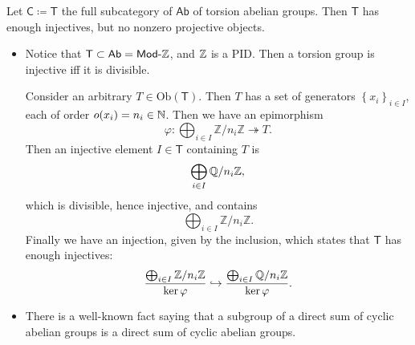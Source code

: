 \begin{ex}
	Let $\mathsf{C} \coloneqq \mathsf{T}$ the full subcategory of $\mathsf{Ab}$ of torsion abelian groups.
	Then $\mathsf{T}$ has enough injectives, but no nonzero projective objects.
	\begin{itemize}
		\item Notice that $\mathsf{T} \subset \mathsf{Ab} = \mathsf{Mod}\text{-}\mathbb{Z}$,
			and $\mathbb{Z}$ is a PID.
			Then a torsion group is injective iff it is divisible.

			Consider an arbitrary $T \in \mathrm{Ob} \left(\mathsf{T}\right)$.
			Then $T$ has a set of generators $\left\{ x_i \right\}_{i \in I}$, each of order
			$o(x_i) = n_i \in \mathbb{N}$.
			Then we have an epimorphism
			\begin{equation}
			\varphi\colon \bigoplus_{i \in I} \mathbb{Z}/n_i\mathbb{Z} \twoheadrightarrow T
			.\end{equation} 
			Then an injective element $I \in \mathsf{T}$ containing $T$ is
			\begin{equation}
			\bigoplus_{i \in I} \mathbb{Q}/n_i \mathbb{Z}
			,\end{equation} 
			which is divisible, hence injective, and contains
			\begin{equation}
			\bigoplus_{i \in I} \mathbb{Z}/n_i\mathbb{Z}
			.\end{equation} 
			Finally we have an injection, given by the inclusion, which 
			states that $\mathsf{T}$ has enough injectives:
			\begin{equation}
			\frac{\bigoplus_{i \in I} \mathbb{Z}/n_i\mathbb{Z}}{\ker \varphi} \hookrightarrow 
			\frac{\bigoplus_{i \in I} \mathbb{Q}/n_i\mathbb{Z}}{\ker \varphi}
			.\end{equation} 
		\item There is a well-known fact saying that a subgroup of a direct sum
			of cyclic abelian groups is a direct sum of cyclic abelian groups.


\end{itemize}
\end{ex}
